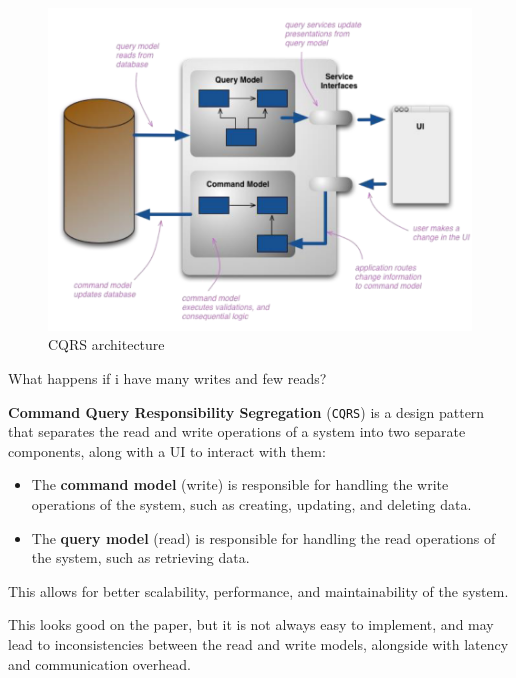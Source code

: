 \begin{paracol}{2}
   
   \begin{figure}[htbp]
      \centering
      \includegraphics[width=0.95\columnwidth]{images/17/cqrs.png}
      \caption{CQRS architecture}
      \label{fig:17/cqrs}
   \end{figure}

   \switchcolumn
   \colfill

   What happens if i have many writes and few reads?
   
   {\textbf{Command Query Responsibility Segregation} (\texttt{CQRS}) is a design pattern that separates the read and write operations of a system into two separate components, along with a UI to interact with them:\ns
   \begin{itemize}
      \item The \textbf{command model} (write) is responsible for handling the write operations of the system, such as creating, updating, and deleting data.
      \item The \textbf{query model} (read) is responsible for handling the read operations of the system, such as retrieving data.
   \end{itemize}}
   This allows for better scalability, performance, and maintainability of the system.
   
   This looks good on the paper, but it is not always easy to implement, and may lead to inconsistencies between the read and write models, alongside with latency and communication overhead.
   \colfill
\end{paracol}

